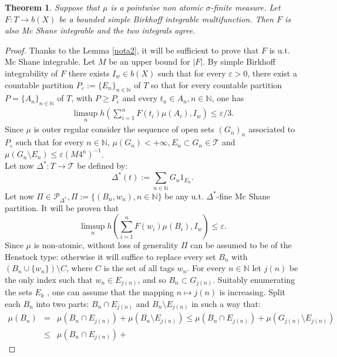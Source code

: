 \documentclass[11pt,a4paper,twoside]{amsart}
\newtheorem{theorem}{Theorem}[section]
\begin{document}
\begin{theorem}\label{wbvms-ca}
Suppose that $\mu$ is a pointwise non atomic  $\sigma$-finite measure.
 Let $F: T \rightarrow b(X)$ be a bounded  simple Birkhoff integrable multifunction.  
Then $F$ is also  Mc Shane integrable and the two integrals agree.
\end{theorem}
\begin{proof}
Thanks to the Lemma \ref{nota2}, it will be sufficient to prove that $F$ is u.t. Mc Shane integrable.
Let $M$ be an upper bound for $|F|$.
By simple Birkhoff integrability of $F$    there exists $I_w \in b(X)$ 
such that
for every $\varepsilon >0$, there exist a countable partition $P_{\varepsilon}:=\{E_{n}\}_{n\in \mathbb{N}}$
of $T$  so that for every countable
partition $P=\{A_{n}\}_{n\in \mathbb{N}}$ of $T$, with $P\geq P_{\varepsilon}$ and every $t_{n}\in A_{n},n\in \mathbb{N}$, one has 
\begin{eqnarray}\label{wb1}
 \limsup_n h\left(\sum_{i=1}^nF(t_i)\mu(A_i),I_w\right)\leq {\varepsilon}/3.
\end{eqnarray}
Since $\mu$ is outer regular consider the sequence of open sets  $(G_n)_n$ associated to  $P_{\varepsilon}$ 
such that for every $n \in \mathbb{N}$, $\mu(G_n)<+\infty, 
E_n \subset G_n \in \mathscr{T} $ and $\mu(G_n \setminus E_n) \leq \varepsilon (M 4^n)^{-1}$.\\
 Let now $\Delta^* : T \rightarrow \mathscr{T}$ be defined by:
\[ \Delta^* (t) := \sum_{n \in \mathbb{N}} G_n 1_{E_n}.\]
Let now $\Pi \in {{\mathcal{P}}}_{\Delta^*}, \Pi := \{(B_n, w_n), n \in \mathbb{N}\}$ be any u.t. $\Delta^*$-fine Mc Shane partition. 
It will be proven that
$$\limsup_nh \left(\sum_{i=1}^n F(w_i)\mu(B_i),I_w\right) \leq {\varepsilon}.$$
Since $\mu$ is non-atomic, without loss of generality $\Pi$ can be assumed to be of the Henstock type: otherwise it will suffice to replace every set $B_n$ with $(B_n\cup\{w_n\})\setminus C$, where $C$ is the set of all tags $w_n$.
For every $n \in \mathbb{N}$ let $j(n)$ be the only index such that
 $w_n \in E_{j(n)}$, and so $B_n \subset G_{j(n)}$. 
Suitably enumerating the sets $E_k$ , one can assume that the mapping $n\mapsto j(n)$ is increasing.
Split each $B_n$ into two parts:
$B_n \cap E_{j(n)}$ and $B_n \setminus E_{j(n)}$ in such a way that:
\begin{eqnarray}\label{2pezzi}
\nonumber
\mu(B_n) &=& \mu(B_n \cap E_{j(n)}) + \mu(B_n \setminus E_{j(n)}) \leq 
\mu(B_n \cap E_{j(n)}) + \mu(G_{j(n)}  \setminus E_{j(n)})\\ &\leq&
 \mu(B_n \cap E_{j(n)}) +

\end{eqnarray}
\end{proof}
\end{document}

